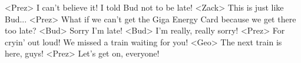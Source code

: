 <Prez> I can't believe it! I told Bud not to be late! 
<Zack> This is just like Bud... 
<Prez> What if we can't get the Giga Energy Card because we get there too late? 
<Bud> Sorry I'm late! 
<Bud> I'm really, really sorry! 
<Prez> For cryin' out loud! We missed a train waiting for you! 
<Geo> The next train is here, guys! 
<Prez> Let's get on, everyone! 
